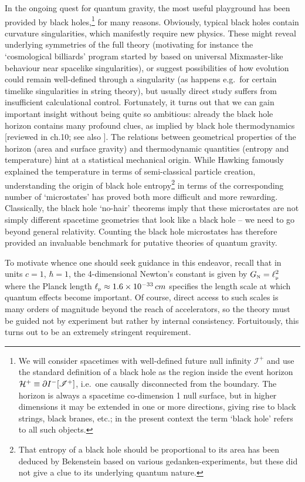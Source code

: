 \documentclass[12pt]{article}
\def\GR{general relativity}
\def\QG{quantum gravity}
\def\GN{G_{\scriptscriptstyle {\rm N}}}
\def\lpl{\ell_{\scriptscriptstyle {\rm p}}}
\def\scri{\mathscr I}
\begin{document}
In the ongoing quest for \QG, the most useful playground has been provided by black holes,\footnote{
We will consider spacetimes with well-defined future null infinity $\scri^+$ and use the standard definition of a black hole as the region inside the event horizon ${\cal H}^+ \equiv \partial I^-[\scri^+]$, i.e.\ one causally disconnected from the boundary.  The horizon is always a spacetime co-dimension 1 null surface, but in higher dimensions it may be extended in one or more directions, giving rise to black strings, black branes, etc.;  in the present context the term `black hole' refers to all such objects.
} for many reasons.  Obviously, typical black holes contain curvature singularities, which manifestly require new physics.  These might reveal underlying symmetries of the full theory 
(motivating for instance the `cosmological billiards' program started by \cite{belinskii1982general} based on universal Mixmaster-like behaviour near spacelike singularities), or suggest possibilities of how evolution could remain well-defined through a singularity (as happens  e.g.\ for certain timelike singularities in string theory),
but usually direct study suffers from insufficient calculational control.
Fortunately,
it turns out that we can gain important insight without being quite so ambitious: already the black hole horizon contains many profound clues,  as implied by black hole thermodynamics [reviewed in ch.10; see also \cite{Wald:1999vt}].  The relations between geometrical properties of the horizon (area and surface gravity) and thermodynamic quantities (entropy and temperature)  hint at a statistical mechanical origin. 
While Hawking \cite{hawking1975particle} famously explained the temperature in terms of semi-classical particle creation, understanding the origin of black hole entropy\footnote{
That entropy of a black hole should be proportional to its area has been  deduced by Bekenstein \cite{bekenstein1973black} based on various gedanken-experiments, but these did not give a clue to its underlying quantum nature.
}
 in terms of the corresponding number of  `microstates' has proved both more difficult and more rewarding.  Classically, the black hole `no-hair' theorems  imply that these microstates are not simply different  spacetime geometries that look like a black hole -- we need to go beyond \GR.
 Counting the black hole microstates has therefore provided an invaluable benchmark for putative theories of \QG.

To motivate whence one should seek guidance in this endeavor, recall that
in  units $c=1$, $\hbar =1$, the 4-dimensional Newton's constant is given by $\GN = \lpl^2$ where the Planck length $\lpl \approx 1.6 \times 10^{-33} \, cm$ specifies the length scale at which quantum effects become important. 
 Of course, direct access to such scales  is many orders of magnitude beyond the reach of accelerators, so the theory must be guided not by experiment but rather by internal consistency.  Fortuitously, this turns out to be an extremely stringent requirement.
\end{document}
